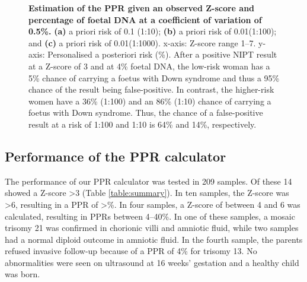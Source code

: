 \begin{figure}[!htb]
	{\caption[PPR at different risks]{\textbf{Estimation of the PPR given an observed Z-score and percentage of foetal DNA at a coefficient of variation of 0.5\%.} \textbf{(a)} a priori risk of 0.1 (1:10); \textbf{(b)} a priori risk of 0.01(1:100); and \textbf{(c)} a priori risk of 0.01(1:1000). x-axis: Z-score range 1–7. y-axis: Personalised a posteriori risk (\%). After a positive NIPT result at a Z-score of 3 and at 4\% foetal DNA, the low-risk woman has a 5\% chance of carrying a foetus with Down syndrome and thus a 95\% chance of the result being false-positive. In contrast, the higher-risk women have a 36\% (1:100) and an 86\% (1:10) chance of carrying a foetus with Down syndrome. Thus, the chance of a false-positive result at a risk of 1:100 and 1:10 is 64\% and 14\%, respectively.}
	\label{fig:NIPTRICFig2}}
\end{figure}


\subsection{Performance of the PPR calculator}
The performance of our PPR calculator was tested in 209 samples. 
Of these 14 showed a Z-score \textgreater 3 (Table \ref{table:summary}). In ten samples, the Z-score was \textgreater 6, resulting in a PPR of \textgreater{}\%. In four samples, a Z-score of between 4 and 6 was calculated, resulting in PPRs between 4–40\%. 
In one of these samples, a mosaic trisomy 21 was confirmed in chorionic villi and amniotic fluid, while two samples had a normal diploid outcome in amniotic fluid. 
In the fourth sample, the parents refused invasive follow-up because of a PPR of 4\% for trisomy 13. 
No abnormalities were seen on ultrasound at 16 weeks’ gestation and a healthy child was born.

